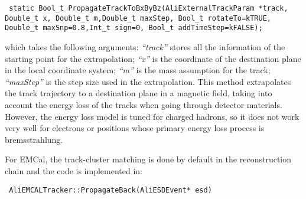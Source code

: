 \begin{DDbox}{\linewidth}
\begin{lstlisting}
 static Bool_t PropagateTrackToBxByBz(AliExternalTrackParam *track, Double_t x, Double_t m,Double_t maxStep, Bool_t rotateTo=kTRUE, Double_t maxSnp=0.8,Int_t sign=0, Bool_t addTimeStep=kFALSE); 
\end{lstlisting}
\end{DDbox}
which takes the following arguments: {\it ``track''} stores all the information of the starting point for the extrapolation; {\it ``x''} is the coordinate of the destination plane in the local coordinate system; {\it ``m''} is the mass assumption for the track; {\it ``maxStep''} is the step size used in the extrapolation. This method extrapolates the track trajectory to a destination plane in a magnetic field, taking into account the energy loss of the tracks when going through detector materials. However, the energy loss model is tuned for charged hadrons, so it does not work very well for electrons or positions whose primary energy loss process is bremsstrahlung.

For EMCal, the track-cluster matching is done by default in the reconstruction chain and the code is implemented in:

\begin{DDbox}{\linewidth}
\begin{lstlisting}
 AliEMCALTracker::PropagateBack(AliESDEvent* esd)
\end{lstlisting}
\end{DDbox}

